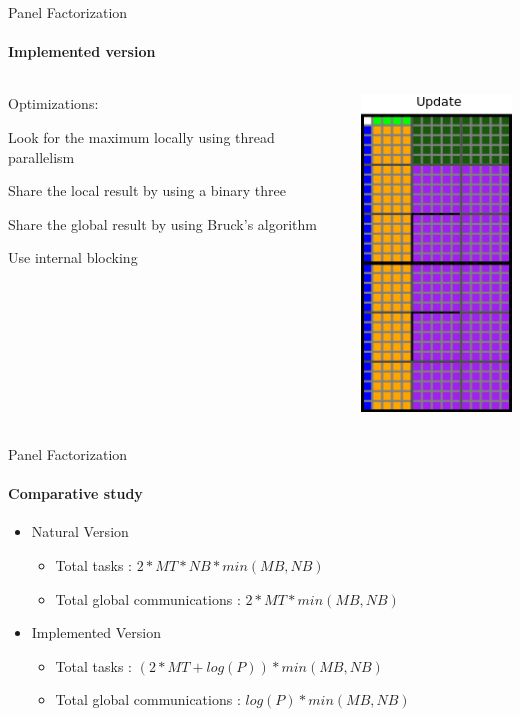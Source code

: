 \begin{frame}{Panel Factorization}
\framesubtitle{Implemented version}
\begin{columns}
\begin{column}{.50\textwidth}
Optimizations:
\begin{itemize}
{
\item Look for the maximum locally using thread parallelism
\item Share the local result by using a binary three
\item Share the global result by using Bruck's algorithm}
\item Use internal blocking
\end{itemize}
\end{column}
\hfill
\begin{column}{.50\textwidth}
\begin{center}
\includegraphics[scale=0.5]{panel_opt2.png}
\end{center}
\end{column}
\end{columns}
\end{frame}

\begin{frame}{Panel Factorization}
\framesubtitle{Comparative study}
\begin{itemize}
\item Natural Version
\begin{exampleblock}{}
\begin{itemize}
\item Total tasks : $2 * MT * NB * min(MB,NB)$
\item Total global communications : $2 * MT * min(MB,NB)$
\end{itemize}
\end{exampleblock}{}
\item Implemented Version
\begin{exampleblock}{}
\begin{itemize}
\item Total tasks : $(2 * MT + log(P)) * min(MB,NB)$
\item Total global communications : $log(P) * min(MB,NB)$
\end{itemize}
\end{exampleblock}{}
\end{itemize}
\end{frame}
